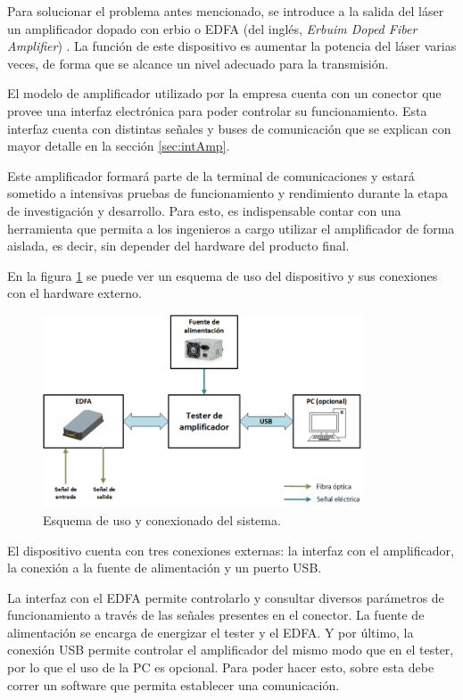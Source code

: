 Para solucionar el problema antes mencionado, se introduce a la salida del láser un amplificador dopado con erbio o EDFA (del inglés, \textit{Erbuim Doped Fiber Amplifier}) \citep{WEBSITE:EDFA2}. La función de este dispositivo es aumentar la potencia del láser varias veces, de forma que se alcance un nivel adecuado para la transmisión.

El modelo de amplificador utilizado por la empresa cuenta con un conector que provee una interfaz electrónica para poder controlar su funcionamiento. Esta interfaz cuenta con distintas señales y buses de comunicación que se explican con mayor detalle en la sección \ref{sec:intAmp}.

Este amplificador formará parte de la terminal de comunicaciones y estará sometido a intensivas pruebas de funcionamiento y rendimiento durante la etapa de investigación y desarrollo. Para esto, es indispensable contar con una herramienta que permita a los ingenieros a cargo utilizar el amplificador de forma aislada, es decir, sin depender del hardware del producto final.

En la figura \ref{fig:bloquesProy} se puede ver un esquema de uso del dispositivo y sus conexiones con el hardware externo.

\begin{figure}[H]
\centering
\includegraphics[width=0.85\textwidth]{./Figures/bloquesProy.png}
\caption{Esquema de uso y conexionado del sistema.}
\label{fig:bloquesProy}
\end{figure}

El dispositivo cuenta con tres conexiones externas: la interfaz con el amplificador, la conexión a la fuente de alimentación y un puerto USB.

La interfaz con el EDFA permite controlarlo y consultar diversos parámetros de funcionamiento a través de las señales presentes en el conector. La fuente de alimentación se encarga de energizar el tester y el EDFA. Y por último, la conexión USB permite controlar el amplificador del mismo modo que en el tester, por lo que el uso de la PC es opcional. Para poder hacer esto, sobre esta debe correr un software que permita establecer una comunicación.

